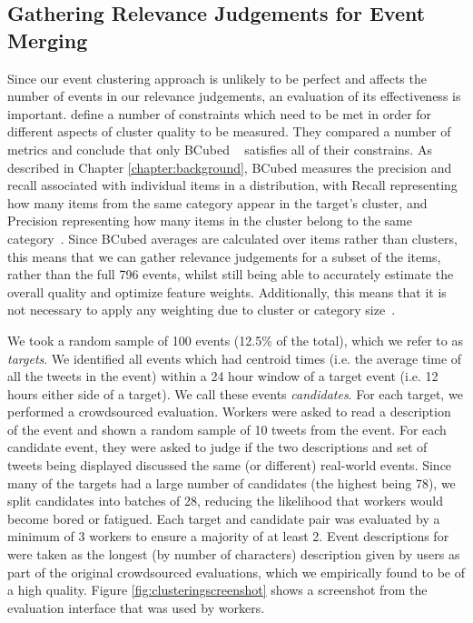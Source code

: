 \subsection{Gathering Relevance Judgements for Event Merging}
\label{sec:clustering}
\label{collection:sec:eval}
Since our event clustering approach is unlikely to be perfect and affects the number of events in our relevance judgements, an evaluation of its effectiveness is important.
\cite{Amigo:2009:CEC:1555682.1555686} define a number of constraints which need to be met in order for different aspects of cluster quality to be measured.
They compared a number of metrics and conclude that only BCubed ~\citep{Bagga:1998:ECC:980845.980859} satisfies all of their constrains.
As described in Chapter \ref{chapter:background}, BCubed measures the precision and recall associated with individual items in a distribution, with Recall representing how many items from the same category appear in the target's cluster, and Precision representing how many items in the cluster belong to the same category~\citep{Amigo:2009:CEC:1555682.1555686}.
Since BCubed averages are calculated over items rather than clusters, this means that we can gather relevance judgements for a subset of the items, rather than the full 796 events, whilst still being able to accurately estimate the overall quality and optimize feature weights.
Additionally, this means that it is not necessary to apply any weighting due to cluster or category size~\citep{Amigo:2009:CEC:1555682.1555686}.

We took a random sample of 100 events (12.5\% of the total), which we refer to as \emph{targets}.
We identified all events which had centroid times (i.e. the average time of all the tweets in the event) within a 24 hour window of a target event (i.e. 12 hours either side of a target).
We call these events \emph{candidates}.
For each target, we performed a crowdsourced evaluation.
Workers were asked to read a description of the event and shown a random sample of 10 tweets from the event.
For each candidate event, they were asked to judge if the two descriptions and set of tweets being displayed discussed the same (or different) real-world events.
Since many of the targets had a large number of candidates (the highest being 78), we split candidates into batches of 28, reducing the likelihood that workers would become bored or fatigued.
Each target and candidate pair was evaluated by a minimum of 3 workers to ensure a majority of at least 2.
Event descriptions for were taken as the longest (by number of characters) description given by users as part of the original crowdsourced evaluations, which we empirically found to be of a high quality.
Figure \ref{fig:clusteringscreenshot} shows a screenshot from the evaluation interface that was used by workers.

